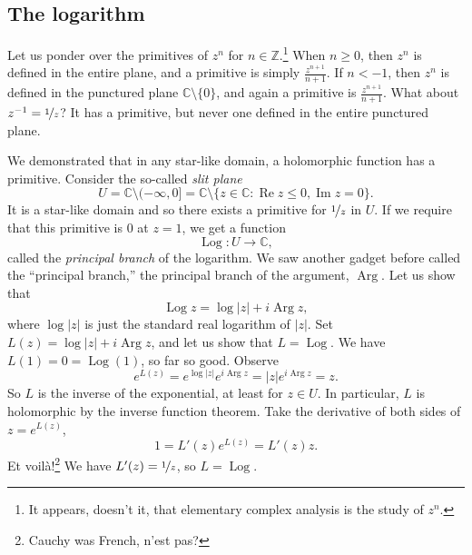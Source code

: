 \documentclass[12pt,openany]{book}
\renewcommand{\Re}{\operatorname{Re}}
\renewcommand{\Im}{\operatorname{Im}}
\newcommand{\Arg}{\operatorname{Arg}}
\newcommand{\Log}{\operatorname{Log}}
\newcommand{\sabs}[1]{\lvert {#1} \rvert}
\newcommand{\C}{{\mathbb{C}}}
\newcommand{\Z}{{\mathbb{Z}}}
\newcommand{\myindex}[1]{#1\index{#1}}
\newcommand{\myquote}[1]{``#1''}
\theoremstyle{plain}
\theoremstyle{remark}
\theoremstyle{definition}
\theoremstyle{exercise}
\theoremstyle{example}
\begin{document}
\subsection{The logarithm}

Let us ponder over the primitives of $z^n$ for $n \in \Z$.\footnote{It appears,
doesn't it, that elementary complex analysis is the study of $z^n$.}
When $n \geq 0$, 
then $z^n$ is defined in the entire plane, and a primitive is
simply $\frac{z^{n+1}}{n+1}$.  If $n < -1$, then $z^n$ is defined
in the punctured plane $\C \setminus \{0\}$, and again
a primitive is $\frac{z^{n+1}}{n+1}$.  What about $z^{-1} =
\nicefrac{1}{z}$?  It has a primitive, but never one defined in
the entire punctured plane.

We demonstrated that in any star-like domain, a holomorphic function has a
primitive.  Consider the so-called \emph{\myindex{slit plane}}
\begin{equation*}
U = \C \setminus (-\infty,0] = \C \setminus \bigl\{ z \in \C : \Re z \leq 0 , \Im z = 0 \bigr\}.
\end{equation*}
It is a star-like domain and
so there exists a
primitive for $\nicefrac{1}{z}$ in $U$.
If we
require that this primitive is $0$ at $z=1$,
we get a function
%
\begin{equation*}
\Log \colon U \to \C ,
\end{equation*}
called the \emph{\myindex{principal branch}} of the logarithm.
We saw another gadget before called the \myquote{principal branch,} 
the principal branch of the argument, $\Arg$.  Let us show that
\begin{equation*}
\Log z = \log \sabs{z} + i \Arg z ,
\end{equation*}
where $\log \sabs{z}$ is just the standard real logarithm of $\sabs{z}$.
Set $L(z) = \log \sabs{z} + i \Arg z$, and let us show that $L = \Log$.
We have $L(1) = 0 = \Log(1)$, so far so good.
Observe
\begin{equation*}
e^{L(z)}
=
e^{\log \sabs{z}} e^{i \Arg z}
=
\sabs{z} e^{i \Arg z} = z .
\end{equation*}
So $L$ is the inverse of the exponential, at least for $z \in U$.
In particular, $L$ is holomorphic by the inverse function
theorem.
Take the derivative of both sides of $z = e^{L(z)}$,
\begin{equation*}
1 = L'(z) e^{L(z)} = L'(z) z .
\end{equation*}
Et voil\`a!\footnote{Cauchy was French, n'est pas?}
We have $L'(z) = \nicefrac{1}{z}$, so $L = \Log$.
\end{document}
